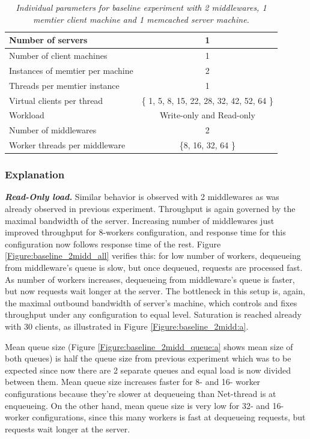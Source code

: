 \documentclass[11pt,a4paper]{article}
\begin{document}
\begin{center}
	\scriptsize{	
		\begin{table}[!ht]
			\centering
			\begin{tabulary}{\linewidth}{ | L | C |}
				\hline Number of servers	&	1	\\
				\hline Number of client machines	&	1	\\
				\hline Instances of memtier per machine	&	2	\\
				\hline Threads per memtier instance	&	1	\\
				\hline Virtual clients per thread	&	\{ 1, 5, 8, 15, 22, 28, 32, 42, 52, 64 \}	\\
				\hline Workload	&	Write-only and Read-only	\\
				\hline Number of middlewares	&	2	\\
				\hline Worker threads per middleware	&	\{8, 16, 32, 64 \}	\\
				\hline 
			\end{tabulary}
			\caption{\textit{Individual parameters for baseline experiment with 2 middlewares, 1 memtier client machine and 1 memcached server machine.}}
			\label{table:baseline_2midd:params}
		\end{table}
	}
\end{center}

\subsubsection{Explanation}

\textbf{\textit{Read-Only load.}} Similar behavior is observed with 2 middlewares as was already observed in previous experiment. Throughput is again governed by the maximal bandwidth of the server. Increasing number of middlewares just improved throughput for 8-workers configuration, and response time for this configuration now follows response time of the rest. Figure \ref{Figure:baseline_2midd_all} verifies this: for low number of workers, dequeueing from middleware's queue is slow, but once dequeued, requests are processed fast. As number of workers increases, dequeueing from middleware's queue is faster, but now requests wait longer at the server. The bottleneck in this setup is, again, the maximal outbound bandwidth of server's machine, which controls and fixes throughput under any configuration to equal level. Saturation is reached already with 30 clients, as illustrated in Figure \ref{Figure:baseline_2midd:a}.

Mean queue size (Figure \ref{Figure:baseline_2midd_queue:a} shows mean size of both queues) is half the queue size from previous experiment which was to be expected since now there are 2 separate queues and equal load is now divided between them. Mean queue size increases faster for 8- and 16- worker configurations because they're slower at dequeueing than Net-thread is at enqueueing. On the other hand, mean queue size is very low for 32- and 16- worker configurations, since this many workers is fast at dequeueing requests, but requests wait longer at the server.
\end{document}
